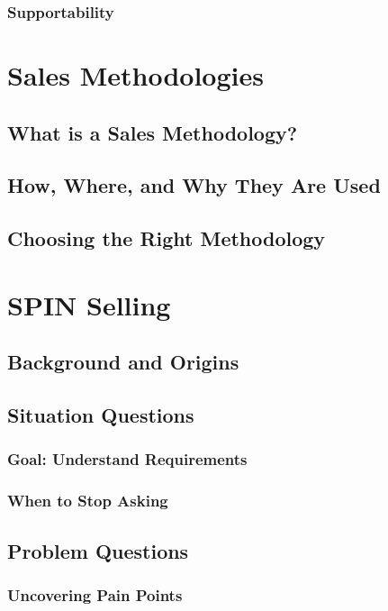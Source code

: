         \subsubsection{Supportability}\mbox{}

\section{Sales Methodologies}\mbox{}
    \subsection{What is a Sales Methodology?}\mbox{}
    \subsection{How, Where, and Why They Are Used}\mbox{}
    \subsection{Choosing the Right Methodology}\mbox{}

\section{SPIN Selling}\mbox{}
    \subsection{Background and Origins}\mbox{}
    \subsection{Situation Questions}\mbox{}
        \subsubsection{Goal: Understand Requirements}\mbox{}
        \subsubsection{When to Stop Asking}\mbox{}
    \subsection{Problem Questions}\mbox{}
        \subsubsection{Uncovering Pain Points}\mbox{}
